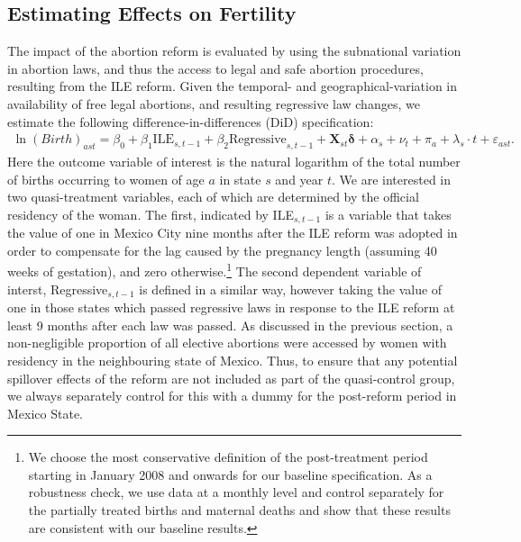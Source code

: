 \documentclass[a4paper,11pt]{article}
\begin{document}
\begin{spacing}{1.5}
\subsection{Estimating Effects on Fertility}
The impact of the abortion reform is evaluated by using the subnational variation in abortion laws, and thus the access to legal and safe abortion procedures, resulting from the ILE reform. Given the temporal- and geographical-variation in availability of free legal abortions, and resulting regressive law changes, we estimate the following difference-in-differences (DiD) specification:
\begin{eqnarray}\label{eq1}
  \ln(Birth)_{ast}= \beta_0 + \beta_1 \text{ILE}_{s,t-1} +\beta_2 \text{Regressive}_{s,t-1}+ \bm{X}_{st}\bm{\delta} +\alpha_{s} + \nu_{t} +\pi_{a}+ \lambda_{s}\cdot t +\varepsilon_{ast}.
\end{eqnarray}
Here the outcome variable of interest is the natural logarithm of the total number of births occurring to women of age $a$ in state $s$ and year $t$.  We are interested in two quasi-treatment variables, each of which are determined by the official residency of the woman.  The first, indicated by ILE$_{s,t-1}$ is a variable that takes the value of one in Mexico City nine months after the ILE reform was adopted in order to compensate for the lag caused by the pregnancy length (assuming 40 weeks of gestation), and zero otherwise.\footnote{We choose the most conservative definition of the post-treatment period starting in January 2008 and onwards for our baseline specification. As a robustness check, we use data at a monthly level and control separately for the partially treated births and maternal deaths and show that these results are consistent with our baseline results.}  The second dependent variable of interst, Regressive$_{s,t-1}$ is defined in a similar way, however taking the value of one in those states which passed regressive laws in response to the ILE reform at least 9 months after each law was passed. As discussed in the previous section, a non-negligible proportion of all elective abortions were accessed by women with residency in the neighbouring state of Mexico. Thus, to ensure that any potential spillover effects of the reform are not included as part of the quasi-control group, we always separately control for this with a dummy for the post-reform period in Mexico State.


\end{spacing}
\end{document}
